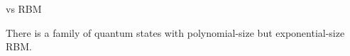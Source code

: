 \begin{frame}{\limdd vs RBM}
\begin{refsection}
%
%
%
%
%
%
%
%
%
%
%
%
%
%
%
%

	


\begin{lemma}
	There is a family of quantum states with polynomial-size \limdd but exponential-size RBM.
\end{lemma}


\end{refsection}
\end{frame}




